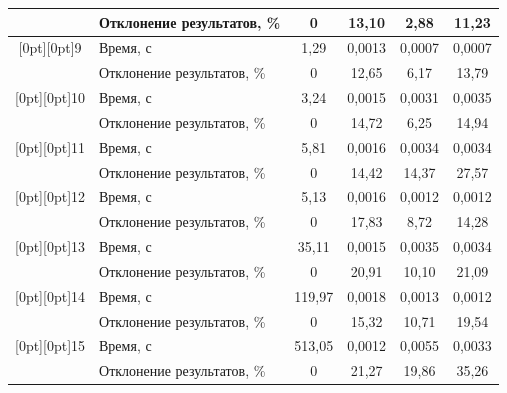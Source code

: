 \begin{table}[b]
\begin{center}
\begin{tabular}{|c|l|c|c|c|c|}
&Отклонение результатов, \%&0&13,10&2,88&11,23\\


\hline


\multicolumn{1}{|c|}{\raisebox{-6pt}[0pt][0pt]{9}}&Время, с&1,29&0,0013&0,0007&0,0007\\


&Отклонение результатов, \%&0&12,65&6,17&13,79\\


\hline


\multicolumn{1}{|c|}{\raisebox{-6pt}[0pt][0pt]{10\hphantom{9}}}&Время, с&3,24&0,0015&0,0031&0,0035\\


&Отклонение результатов, \%&0&14,72&6,25&14,94\\


\hline


\multicolumn{1}{|c|}{\raisebox{-6pt}[0pt][0pt]{11\hphantom{9}}}&Время, с&5,81&0,0016&0,0034&0,0034\\


&Отклонение результатов, \%&0&14,42&14,37&27,57\\


\hline


\multicolumn{1}{|c|}{\raisebox{-6pt}[0pt][0pt]{12\hphantom{9}}}&Время, с&5,13&0,0016&0,0012&0,0012\\


&Отклонение результатов, \%&0&17,83&8,72&14,28\\


\hline


\multicolumn{1}{|c|}{\raisebox{-6pt}[0pt][0pt]{13\hphantom{9}}}&Время, с&35,11&0,0015&0,0035&0,0034\\


&Отклонение результатов, \%&0&20,91&10,10&21,09\\


\hline


\multicolumn{1}{|c|}{\raisebox{-6pt}[0pt][0pt]{14\hphantom{9}}}&Время, с&119,97&0,0018&0,0013&0,0012\\


&Отклонение результатов, \%&0&15,32&10,71&19,54\\


\hline


\multicolumn{1}{|c|}{\raisebox{-6pt}[0pt][0pt]{15\hphantom{9}}}&Время, с&513,05&0,0012&0,0055&0,0033\\


&Отклонение результатов, \%&0&21,27&19,86&35,26\\



\end{tabular}
\end{center}
\end{table}

